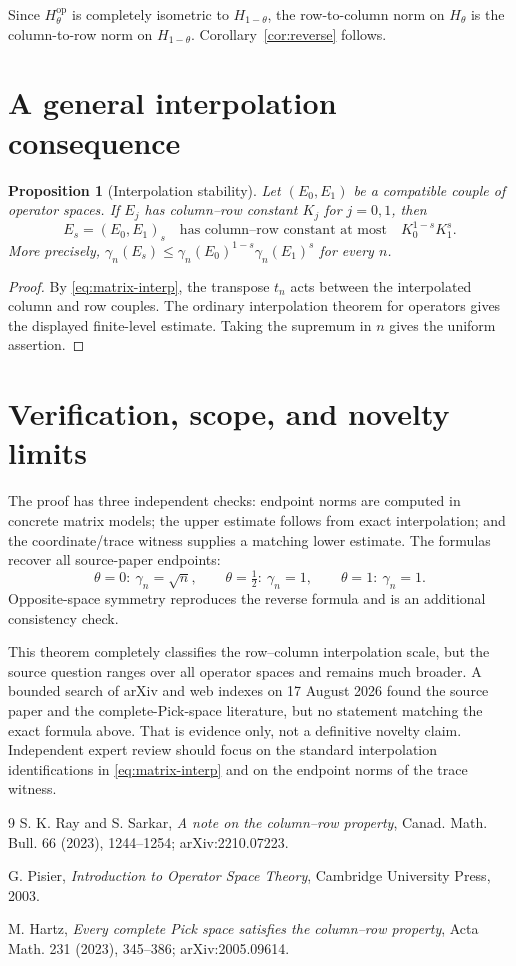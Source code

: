 \documentclass[11pt]{article}
\newtheorem{proposition}[theorem]{Proposition}
\theoremstyle{definition}
\newcommand{\op}{\mathrm{op}}
\begin{document}
Since \(H_\theta^{\op}\) is completely isometric to \(H_{1-\theta}\), the
row-to-column norm on \(H_\theta\) is the column-to-row norm on
\(H_{1-\theta}\).  Corollary~\ref{cor:reverse} follows.

\section{A general interpolation consequence}

\begin{proposition}[Interpolation stability]\label{prop:stability}
Let \((E_0,E_1)\) be a compatible couple of operator spaces.  If \(E_j\) has
column--row constant \(K_j\) for \(j=0,1\), then
\[
 E_s=(E_0,E_1)_s
 \quad\text{has column--row constant at most}\quad
 K_0^{1-s}K_1^s.
\]
More precisely,
\(
 \gamma_n(E_s)\leq\gamma_n(E_0)^{1-s}\gamma_n(E_1)^s
\)
for every \(n\).
\end{proposition}

\begin{proof}
By \eqref{eq:matrix-interp}, the transpose \(t_n\) acts between the
interpolated column and row couples.  The ordinary interpolation theorem for
operators gives the displayed finite-level estimate.  Taking the supremum in
\(n\) gives the uniform assertion.
\end{proof}

\section{Verification, scope, and novelty limits}

The proof has three independent checks: endpoint norms are computed in
concrete matrix models; the upper estimate follows from exact interpolation;
and the coordinate/trace witness supplies a matching lower estimate.  The
formulas recover all source-paper endpoints:
\[
 \theta=0:\ \gamma_n=\sqrt n,
 \qquad
 \theta=\tfrac12:\ \gamma_n=1,
 \qquad
 \theta=1:\ \gamma_n=1.
\]
Opposite-space symmetry reproduces the reverse formula and is an additional
consistency check.

This theorem completely classifies the row--column interpolation scale, but
the source question ranges over all operator spaces and remains much broader.
A bounded search of arXiv and web indexes on 17 August 2026 found the source
paper and the complete-Pick-space literature, but no statement matching the
exact formula above.  That is evidence only, not a definitive novelty claim.
Independent expert review should focus on the standard interpolation
identifications in \eqref{eq:matrix-interp} and on the endpoint norms of the
trace witness.

\begin{thebibliography}{9}
S. K. Ray and S. Sarkar,
\emph{A note on the column--row property},
Canad. Math. Bull. 66 (2023), 1244--1254; arXiv:2210.07223.

G. Pisier,
\emph{Introduction to Operator Space Theory},
Cambridge University Press, 2003.

M. Hartz,
\emph{Every complete Pick space satisfies the column--row property},
Acta Math. 231 (2023), 345--386; arXiv:2005.09614.
\end{thebibliography}
\end{document}
